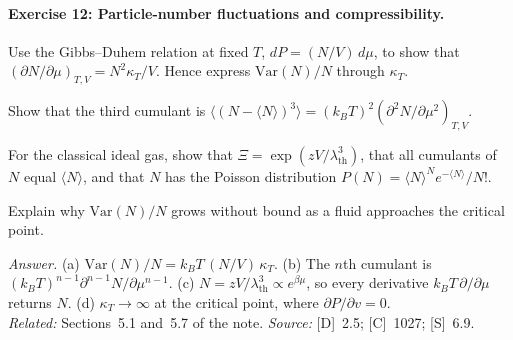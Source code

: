 \documentclass[11pt]{article}      %
\numberwithin{equation}{section}   %
\begin{document}
\paragraph{Exercise 12: Particle-number fluctuations and compressibility.}
\begin{parts}
    \item Use the Gibbs--Duhem relation at fixed $T$, $dP = (N/V)\,d\mu$, to show that $(\partial N/\partial\mu)_{T,V} = N^2\kappa_T/V$. Hence express $\mathrm{Var}(N)/N$ through $\kappa_T$.
    \item Show that the third cumulant is $\langle(N - \langle N\rangle)^3\rangle = (k_BT)^2(\partial^2N/\partial\mu^2)_{T,V}$.
    \item For the classical ideal gas, show that $\Xi = \exp(zV/\lambda_{\text{th}}^3)$, that all cumulants of $N$ equal $\langle N\rangle$, and that $N$ has the Poisson distribution $P(N) = \langle N\rangle^Ne^{-\langle N\rangle}/N!$.
    \item Explain why $\mathrm{Var}(N)/N$ grows without bound as a fluid approaches the critical point.
\end{parts}
\textit{Answer.} (a) $\mathrm{Var}(N)/N = k_BT\,(N/V)\,\kappa_T$. (b) The $n$th cumulant is $(k_BT)^{n-1}\partial^{n-1}N/\partial\mu^{n-1}$. (c) $N = zV/\lambda_{\text{th}}^3 \propto e^{\beta\mu}$, so every derivative $k_BT\,\partial/\partial\mu$ returns $N$. (d) $\kappa_T \to \infty$ at the critical point, where $\partial P/\partial v = 0$.\\
\textit{Related:} Sections~5.1 and~5.7 of the note. \textit{Source:} [D]~2.5; [C]~1027; [S]~6.9.
\end{document}
